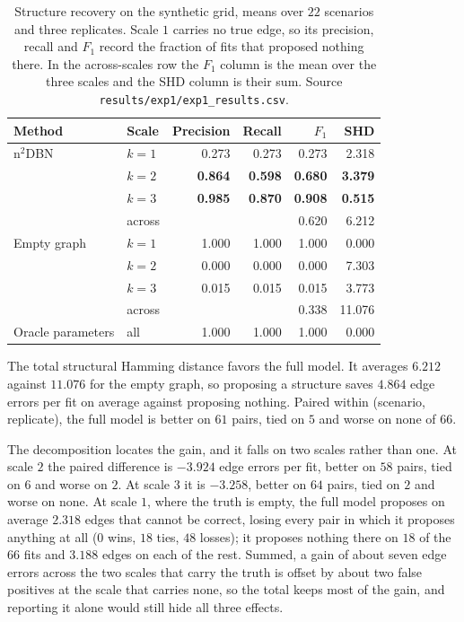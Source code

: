 \begin{table}[t]
\centering
\caption{Structure recovery on the synthetic grid, means over $22$ scenarios
and three replicates. Scale $1$ carries no true edge, so its precision, recall
and $F_1$ record the fraction of fits that proposed nothing there. In the
across-scales row the $F_1$ column is the mean over the three scales and the
SHD column is their sum. Source
\texttt{results/exp1/exp1\_results.csv}.}
\label{tab:results:exp1}
\begin{tabular}{llrrrr}
\toprule
Method & Scale & Precision & Recall & $F_1$ & SHD \\
\midrule
n$^2$DBN      & $k=1$ & 0.273 & 0.273 & 0.273 & 2.318 \\
              & $k=2$ & \textbf{0.864} & \textbf{0.598} & \textbf{0.680} & \textbf{3.379} \\
              & $k=3$ & \textbf{0.985} & \textbf{0.870} & \textbf{0.908} & \textbf{0.515} \\
              & across &      &       & 0.620 & 6.212 \\
\midrule
Empty graph   & $k=1$ & 1.000 & 1.000 & 1.000 & 0.000 \\
              & $k=2$ & 0.000 & 0.000 & 0.000 & 7.303 \\
              & $k=3$ & 0.015 & 0.015 & 0.015 & 3.773 \\
              & across &      &       & 0.338 & 11.076 \\
\midrule
Oracle parameters & all & 1.000 & 1.000 & 1.000 & 0.000 \\
\bottomrule
\end{tabular}
\end{table}

The total structural Hamming distance favors the full model. It averages
$6.212$ against $11.076$ for the empty graph, so proposing a structure saves
$4.864$ edge errors per fit on average against proposing nothing. Paired within
(scenario, replicate), the full model is better on $61$ pairs, tied on $5$ and
worse on none of $66$.

The decomposition locates the gain, and it falls on two scales rather than
one. At scale $2$ the paired difference is $-3.924$ edge errors per fit, better
on $58$ pairs, tied on $6$ and worse on $2$. At scale $3$ it is $-3.258$,
better on $64$ pairs, tied on $2$ and worse on none. At scale $1$, where the
truth is empty, the full model proposes on average $2.318$ edges that cannot be
correct, losing every pair in which it proposes anything at all ($0$ wins, $18$
ties, $48$ losses); it proposes nothing there on $18$ of the $66$ fits and
$3.188$ edges on each of the rest. Summed, a gain of about seven edge errors
across the two scales that carry the truth is offset by about two false
positives at the scale that carries none, so the total keeps most of the gain,
and reporting it alone would still hide all three effects.

